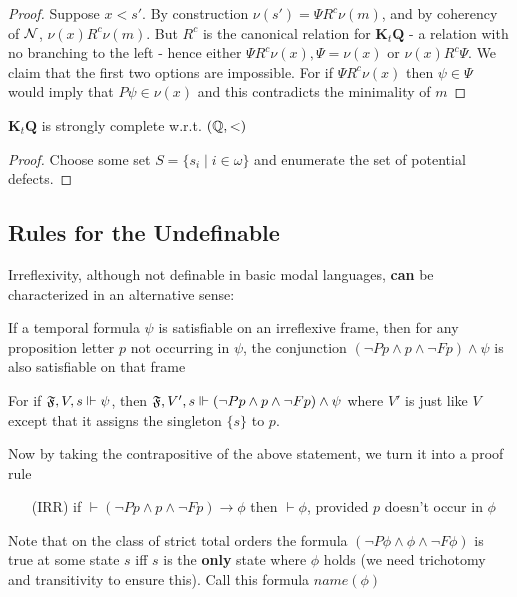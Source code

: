 \documentclass[11pt]{article}
\newcommand{\KtQ}{\textbf{K}_t\textbf{Q}}
\begin{document}
\begin{proof}
Suppose \(x<s'\). By construction \(\nu(s')=\Psi R^c\nu(m)\), and by coherency
of \(\mathcal{N}\), \(\nu(x)R^c\nu(m)\). But \(R^c\) is the canonical relation for
\(\KtQ\) - a relation with no branching to the left - hence either \(\Psi
   R^c\nu(x),\Psi=\nu(x)\) or \(\nu(x)R^c\Psi\). We claim that the first two
options are impossible. For if \(\Psi R^c\nu(x)\) then \(\psi\in\Psi\) would
imply that \(P\psi\in\nu(x)\) and this contradicts the minimality of \(m\)
\end{proof}

\begin{theorem}[]
\(\KtQ\) is strongly complete w.r.t. \((\mathbb{Q},<)\)
\end{theorem}

\begin{proof}
Choose some set \(S=\{s_i\mid i\in\omega\}\) and enumerate the set of
potential defects.
\end{proof}
\subsection{Rules for the Undefinable}
\label{sec:org30059a4}
Irreflexivity, although not definable in basic modal languages, \textbf{can} be
characterized in an alternative sense:
\begin{center}
If a temporal formula \(\psi\) is satisfiable on an irreflexive frame, then for any
proposition letter \(p\) not occurring in \(\psi\), the conjunction \((\neg
   Pp\wedge p\wedge\neg Fp)\wedge\psi\) is also satisfiable on that frame
\end{center}
For if \(\mathfrak{F},V,s\Vdash\psi\), then
\(\mathfrak{F},V',s\Vdash(\neg Pp\wedge p\wedge\neg Fp)\wedge\psi\) where \(V'\) is
just like \(V\) except that it assigns the singleton \(\{s\}\) to \(p\).

Now by taking the contrapositive of the above statement, we turn it into a
proof rule

\begin{itemize}
\item [(IRR)] if \(\vdash(\neg Pp\wedge p\wedge\neg Fp)\to\phi\) then \(\vdash\phi\), provided
\(p\) doesn't occur in \(\phi\)
\end{itemize}

Note that on the class of strict total orders the formula
\((\neg P\phi\wedge\phi\wedge\neg F\phi)\) is true at some state \(s\) iff
\(s\) is the \textbf{only} state where \(\phi\) holds (we need trichotomy and transitivity to
ensure this). Call this formula \(name(\phi)\)
\end{document}
